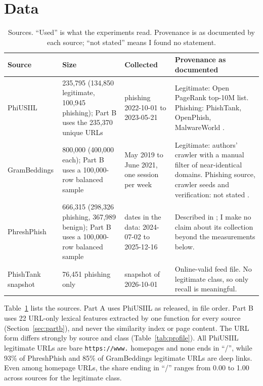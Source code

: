 \documentclass[10pt]{article}
\begin{document}
\section{Data}
\begin{table}[t]
\centering\footnotesize
\caption{Sources. ``Used'' is what the experiments read. Provenance is as documented by each source; ``not stated'' means I found no statement.}
\label{tab:data}
\begin{tabular}{p{0.8in}p{1.05in}p{1.2in}p{2.65in}}
\toprule
\textbf{Source} & \textbf{Size} & \textbf{Collected} & \textbf{Provenance as documented}\\
\midrule
PhiUSIIL & 235,795 (134,850 legitimate, 100,945 phishing); Part B uses the 235,370 unique URLs & phishing 2022-10-01 to 2023-05-21 & Legitimate: Open PageRank top-10M list. Phishing: PhishTank, OpenPhish, MalwareWorld \cite{prasad2024}.\\
GramBeddings & 800,000 (400,000 each); Part B uses a 100,000-row balanced sample & May 2019 to June 2021, one session per week & Legitimate: authors' crawler with a manual filter of near-identical domains. Phishing source, crawler seeds and verification: not stated \cite{gram}.\\
PhreshPhish & 666,315 (298,326 phishing, 367,989 benign); Part B uses a 100,000-row balanced sample & dates in the data: 2024-07-02 to 2025-12-16 & Described in \cite{dalton2025}; I make no claim about its collection beyond the measurements below.\\
PhishTank snapshot & 76,451 phishing only & snapshot of 2026-10-01 & Online-valid feed file. No legitimate class, so only recall is meaningful.\\
\bottomrule
\end{tabular}
\end{table}

Table~\ref{tab:data} lists the sources. Part A uses PhiUSIIL as released, in file order. Part B uses 22 URL-only lexical features extracted by one function for every source (Section~\ref{sec:partb}), and never the similarity index or page content. The URL form differs strongly by source and class (Table~\ref{tab:profile}). All PhiUSIIL legitimate URLs are bare \texttt{https://www.} homepages and none ends in ``/'', while 93\% of PhreshPhish and 85\% of GramBeddings legitimate URLs are deep links. Even among homepage URLs, the share ending in ``/'' ranges from 0.00 to 1.00 across sources for the legitimate class.

\begin{table}[t]
\centering
\caption{URL form by source and class. Shares of rows. ``hp'' columns restrict to homepage URLs (nothing after the host); ``Homepage share'' and ``https (all)'' use all rows of the class.}
\label{tab:profile}

\end{table}
\end{document}
